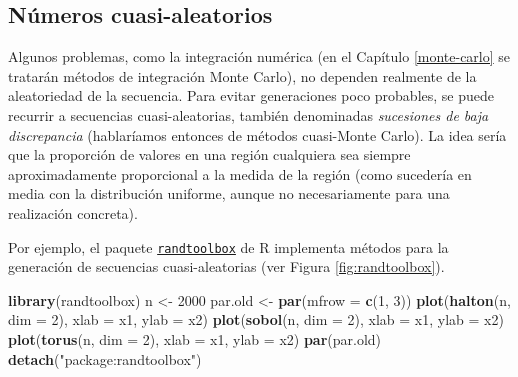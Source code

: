 \documentclass[
  spanish,
  10pt,
]{book}
\newenvironment{Shaded}{\begin{snugshade}}{\end{snugshade}}
\newcommand{\AttributeTok}[1]{\textcolor[rgb]{0.13,0.29,0.53}{#1}}
\newcommand{\DecValTok}[1]{\textcolor[rgb]{0.00,0.00,0.81}{#1}}
\newcommand{\FunctionTok}[1]{\textcolor[rgb]{0.13,0.29,0.53}{\textbf{#1}}}
\newcommand{\NormalTok}[1]{#1}
\newcommand{\OtherTok}[1]{\textcolor[rgb]{0.56,0.35,0.01}{#1}}
\newcommand{\StringTok}[1]{\textcolor[rgb]{0.31,0.60,0.02}{#1}}
\theoremstyle{break}
\theoremstyle{nonumberplain}
\begin{document}
\subsection{Números cuasi-aleatorios}\label{nuxfameros-cuasi-aleatorios}

Algunos problemas, como la integración numérica (en el Capítulo \ref{monte-carlo} se tratarán métodos de integración Monte Carlo), no dependen realmente de la aleatoriedad de la secuencia. Para evitar generaciones poco probables, se puede recurrir a secuencias cuasi-aleatorias, también denominadas \emph{sucesiones de baja discrepancia} (hablaríamos entonces de métodos cuasi-Monte Carlo). La idea sería que la proporción de valores en una región cualquiera sea siempre aproximadamente proporcional a la medida de la región (como sucedería en media con la distribución uniforme, aunque no necesariamente para una realización concreta).

Por ejemplo, el paquete \href{https://CRAN.R-project.org/package=randtoolbox}{\texttt{randtoolbox}} de R implementa métodos para la generación de secuencias cuasi-aleatorias (ver Figura \ref{fig:randtoolbox}).

\begin{Shaded}
\begin{Highlighting}[]
\FunctionTok{library}\NormalTok{(randtoolbox)}
\NormalTok{n }\OtherTok{\textless{}{-}} \DecValTok{2000}
\NormalTok{par.old }\OtherTok{\textless{}{-}} \FunctionTok{par}\NormalTok{(}\AttributeTok{mfrow =} \FunctionTok{c}\NormalTok{(}\DecValTok{1}\NormalTok{, }\DecValTok{3}\NormalTok{))}
\FunctionTok{plot}\NormalTok{(}\FunctionTok{halton}\NormalTok{(n, }\AttributeTok{dim =} \DecValTok{2}\NormalTok{), }\AttributeTok{xlab =} \StringTok{\textquotesingle{}x1\textquotesingle{}}\NormalTok{, }\AttributeTok{ylab =} \StringTok{\textquotesingle{}x2\textquotesingle{}}\NormalTok{)}
\FunctionTok{plot}\NormalTok{(}\FunctionTok{sobol}\NormalTok{(n, }\AttributeTok{dim =} \DecValTok{2}\NormalTok{), }\AttributeTok{xlab =} \StringTok{\textquotesingle{}x1\textquotesingle{}}\NormalTok{, }\AttributeTok{ylab =} \StringTok{\textquotesingle{}x2\textquotesingle{}}\NormalTok{)}
\FunctionTok{plot}\NormalTok{(}\FunctionTok{torus}\NormalTok{(n, }\AttributeTok{dim =} \DecValTok{2}\NormalTok{), }\AttributeTok{xlab =} \StringTok{\textquotesingle{}x1\textquotesingle{}}\NormalTok{, }\AttributeTok{ylab =} \StringTok{\textquotesingle{}x2\textquotesingle{}}\NormalTok{)}
\FunctionTok{par}\NormalTok{(par.old)}
\FunctionTok{detach}\NormalTok{(}\StringTok{"package:randtoolbox"}\NormalTok{)}
\end{Highlighting}
\end{Shaded}
\end{document}
